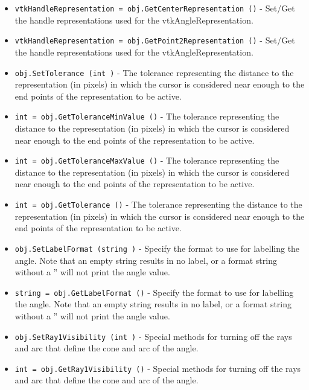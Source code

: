\begin{itemize}
\item  \verb|vtkHandleRepresentation = obj.GetCenterRepresentation ()| -  Set/Get the handle representations used for the vtkAngleRepresentation.

\item  \verb|vtkHandleRepresentation = obj.GetPoint2Representation ()| -  Set/Get the handle representations used for the vtkAngleRepresentation.

\item  \verb|obj.SetTolerance (int )| -  The tolerance representing the distance to the representation (in
 pixels) in which the cursor is considered near enough to the end points
 of the representation to be active.

\item  \verb|int = obj.GetToleranceMinValue ()| -  The tolerance representing the distance to the representation (in
 pixels) in which the cursor is considered near enough to the end points
 of the representation to be active.

\item  \verb|int = obj.GetToleranceMaxValue ()| -  The tolerance representing the distance to the representation (in
 pixels) in which the cursor is considered near enough to the end points
 of the representation to be active.

\item  \verb|int = obj.GetTolerance ()| -  The tolerance representing the distance to the representation (in
 pixels) in which the cursor is considered near enough to the end points
 of the representation to be active.

\item  \verb|obj.SetLabelFormat (string )| -  Specify the format to use for labelling the angle. Note that an empty
 string results in no label, or a format string without a ''%
 will not print the angle value.

\item  \verb|string = obj.GetLabelFormat ()| -  Specify the format to use for labelling the angle. Note that an empty
 string results in no label, or a format string without a ''%
 will not print the angle value.

\item  \verb|obj.SetRay1Visibility (int )| -  Special methods for turning off the rays and arc that define the cone
 and arc of the angle.

\item  \verb|int = obj.GetRay1Visibility ()| -  Special methods for turning off the rays and arc that define the cone
 and arc of the angle.


\end{itemize}
